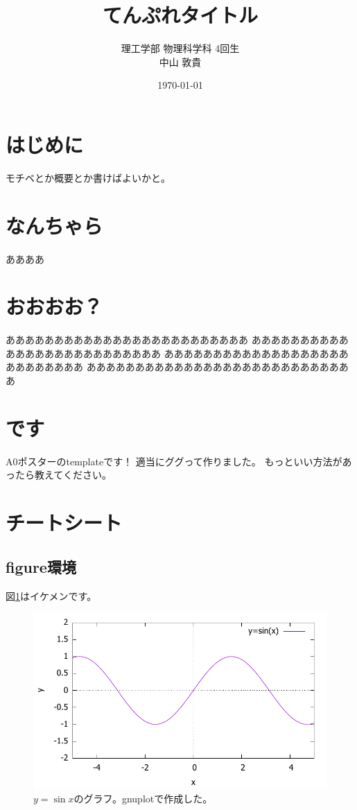 \documentclass[36pt,twocolumn,dvipdfmx]{jsarticle}
\title{てんぷれタイトル}
\author{理工学部 物理科学科 4回生 \\ 中山 敦貴}
\date{\today}
\begin{document}
\maketitle %
\thispagestyle{empty}

\section*{はじめに}
モチベとか概要とか書けばよいかと。

\section{なんちゃら}
ああああ

\section{おおおお？}
あああああああああああああああああああああああああ
ああああああああああああああああああああああああああ
あああああああああああああああああああああああああああ
ああああああああああああああああああああああああああああ

\section{です}
A0ポスターのtemplateです！
適当にググって作りました。
もっといい方法があったら教えてください。


\newpage
\section{チートシート}

\subsection{figure環境}
図\ref{fig:sin}はイケメンです。
\begin{figure}[htbp]
  \centering
  \includegraphics[width=.8\linewidth]{img/fig-sin.pdf}
  \caption{$y=\sin x$のグラフ。gnuplotで作成した。}
  \label{fig:sin}
\end{figure}
\end{document}
